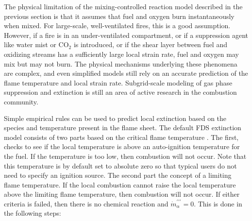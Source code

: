 \label{extinction}

The physical limitation of the mixing-controlled reaction model described in the previous section is that it assumes that fuel and oxygen burn instantaneously when mixed. For large-scale, well-ventilated
fires, this is a good assumption. However, if a fire is in an
under-ventilated compartment, or if a suppression agent like water
mist or CO$_2$ is introduced, or if the shear layer between fuel and oxidizing streams
has a sufficiently large local strain rate,
fuel and oxygen may mix but may not burn.
The physical mechanisms underlying these phenomena are complex, and
even simplified models still rely on an accurate prediction
of the flame temperature and local strain rate.
Subgrid-scale modeling of gas phase suppression and
extinction is still an area of active research in the combustion
community.

Simple empirical rules can be used to predict local
extinction based on the species and temperature present in the flame sheet.  The default FDS extinction model consists of two parts based on the critical flame temperature \cite{SFPE:Beyler}. The first, checks to see if the local temperature is above an auto-ignition temperature for the fuel.  If the temperature is too low, then combustion will not occur.  Note that this temperature is by default set to absolute zero so that typical users do not need to specify an ignition source.  The second part the concept of a limiting flame temperature.  If the local combustion cannot raise the local temperature above the limiting flame temperature, then combustion will not occur. If either criteria is failed, then there is no chemical reaction and $\dot{m}^{\prime\prime\prime}_{\alpha}=0$. This is done in the following steps:

